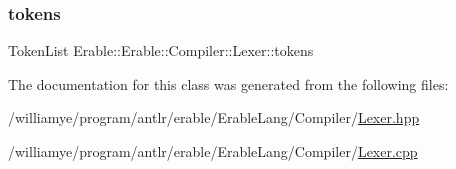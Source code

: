 \subsubsection{\texorpdfstring{tokens}{tokens}}
{\footnotesize\ttfamily Token\+List Erable\+::\+Erable\+::\+Compiler\+::\+Lexer\+::tokens\hspace{0.3cm}{\ttfamily [private]}}



The documentation for this class was generated from the following files\+:\begin{DoxyCompactItemize}
\item 
/williamye/program/antlr/erable/\+Erable\+Lang/\+Compiler/\mbox{\hyperlink{_lexer_8hpp}{Lexer.\+hpp}}\item 
/williamye/program/antlr/erable/\+Erable\+Lang/\+Compiler/\mbox{\hyperlink{_lexer_8cpp}{Lexer.\+cpp}}\end{DoxyCompactItemize}
